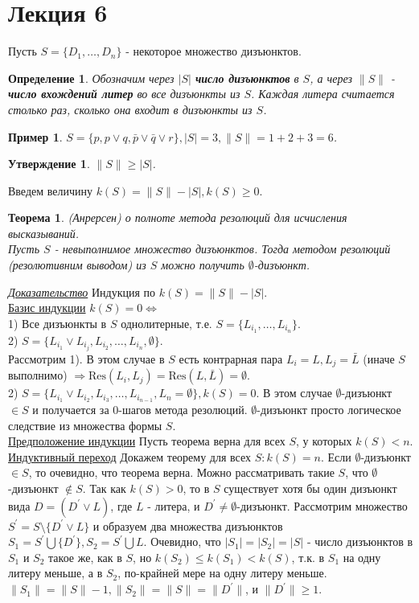 \documentclass{article}
\newtheorem{example}{Пример}
\newtheorem{theorem}{Теорема}
\newtheorem{definition}{Определение}
\newtheorem{proposition}{Утверждение}
\numberwithin{example}{section}
\numberwithin{question}{section}
\numberwithin{Remark}{section}
\numberwithin{theorem}{section}
\numberwithin{definition}{section}
\numberwithin{proposition}{section}
\begin{document}
\section{Лекция 6}
Пусть $S=\{D_1,\ldots,D_n \}$ - некоторое множество дизъюнктов. 
\begin{definition}
Обозначим через $|S|$ \textbf{число дизъюнктов} в $S$, а через $\|S\|$ - \textbf{число вхождений литер} во все дизъюнкты из $S$. Каждая литера считается столько раз, сколько она входит в дизъюнкты из $S$.
\end{definition}
\begin{example}
	$S=\{p,p\vee q,\bar{p}\vee \bar{q}\vee r \},|S|=3,\|S\|=1+2+3=6$.
\end{example}
\begin{proposition}
	$\|S\|\geqslant |S|$.
\end{proposition}
Введем величину $k(S)=\|S\|-|S|,k(S)\geqslant 0$.
\begin{theorem}
(Анрерсен) о полноте метода резолюций для исчисления высказываний.\\
Пусть $S$ - невыполнимое множество дизъюнктов. Тогда методом резолюций (резолютивним выводом) из $S$ можно получить $\emptyset$-дизъюнкт.
\end{theorem}
\underline{\emph{Доказательство}} Индукция по $k(S)=\|S\|-|S|$.\\
\underline{Базис индукции} $k(S)=0\Leftrightarrow$\\
1) Все дизъюнкты в $S$ однолитерные, т.е. $S=\{L_{i_1},\ldots,L_{i_n} \}$.\\
2) $S=\{L_{i_1}\vee L_{i_j},L_{i_2},\ldots,L_{i_n},\emptyset \}$.\\
Рассмотрим 1). В этом случае в $S$ есть контрарная пара $L_i=L,L_j=\bar{L}$ (иначе $S$ выполнимо) $\Rightarrow\mathrm{Res}(L_i,L_j)=\mathrm{Res}(L,\bar{L})=\emptyset$. \\
2) $S=\{L_{i_1}\vee L_{i_2},L_{i_3},\ldots,L_{i_{n-1}},L_n=\emptyset \},k(S)=0$. В этом случае $\emptyset$-дизъюнкт $\in S$ и получается за $0$-шагов метода резолюций. $\emptyset$-дизъюнкт просто логическое следствие из множества формы $S$.\\
\underline{Предположение индукции} Пусть теорема верна для всех $S$, у которых $k(S)<n$.\\
\underline{Индуктивный переход} Докажем теорему для всех $S:k(S)=n$. Если $\emptyset$-дизъюнкт $\in S$, то очевидно, что теорема верна. Можно рассматривать такие $S$, что $\emptyset$-дизъюнкт $\notin S$. Так как $k(S)>0$, то в $S$ существует хотя бы один дизъюнкт вида $D=(D^{'}\vee L)$, где $L$ - литера, и $D^{'}\ne \emptyset$-дизъюнкт. Рассмотрим множество $S^{'}=S\setminus \{D^{'}\vee L \}$ и образуем два множества дизъюнктов $S_1=S^{'}\bigcup\{D^{'}\},S_2=S^{'}\bigcup{L}$. Очевидно, что $|S_1|=|S_2|=|S|$ - число дизъюнктов в $S_1$ и $S_2$ такое же, как в $S$, но $k(S_2)\leqslant k(S_1)<k(S)$, т.к. в $S_1$ на одну литеру меньше, а в $S_2$, по-крайней мере на одну литеру меньше. $\|S_1\|=\|S\|-1,\|S_2\|=\|S\|=\|D^{'}\|$, и $\|D^{'}\|\geqslant 1$.\\
\end{document}
